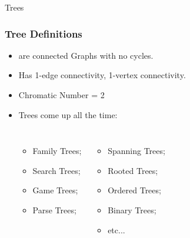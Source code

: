 \documentclass{beamer}
\begin{document}
\begin{frame}
  \begin{center}
    {\huge Trees}
  \end{center}
\end{frame}

\begin{frame}
  \frametitle{Tree Definitions}

  {\larger
    \begin{itemize}
    \item {} are connected Graphs with \alert{no cycles}.
    \item Has 1-edge connectivity, 1-vertex connectivity.
    \item Chromatic Number = 2

      \bigskip

    \item Trees come up all the time:
      \begin{columns}
        \begin{itemize}
        \item Family Trees;
        \item Search Trees;
        \item Game Trees;
        \item Parse Trees;
        \end{itemize}
        \begin{itemize}
        \item Spanning Trees;
        \item Rooted Trees;
        \item Ordered Trees;
        \item Binary Trees;
        \item etc...
        \end{itemize}
      \end{columns}
    \end{itemize}
  }
\end{frame}
\end{document}
